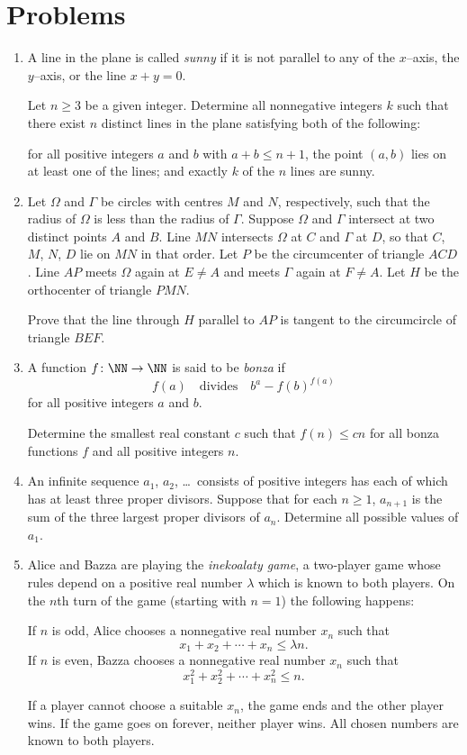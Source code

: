 \documentclass[11pt]{scrartcl}
\begin{document}
\section{Problems}
\begin{enumerate}[\bfseries 1.]
\item %
A line in the plane is called \emph{sunny}
if it is not parallel to any of the $x$–axis, the $y$–axis, or the line $x+y=0$.

Let $n \ge 3$ be a given integer.
Determine all nonnegative integers $k$ such that there exist $n$ distinct lines
in the plane satisfying both of the following:
\begin{itemize}
\ii for all positive integers $a$ and $b$ with $a+b\le n+1$,
  the point $(a,b)$ lies on at least one of the lines; and
\ii exactly $k$ of the $n$ lines are sunny.
\end{itemize}

\item %
Let $\Omega$ and $\Gamma$ be circles with centres $M$ and $N$, respectively,
such that the radius of $\Omega$ is less than the radius of $\Gamma$.
Suppose $\Omega$ and $\Gamma$ intersect at two distinct points $A$ and $B$.
Line $MN$ intersects $\Omega$ at $C$ and $\Gamma$ at $D$,
so that $C$, $M$, $N$, $D$ lie on $MN$ in that order.
Let $P$ be the circumcenter of triangle $ACD$.
Line $AP$ meets $\Omega$ again at $E \neq A$ and meets $\Gamma$ again at $F \neq A$.
Let $H$ be the orthocenter of triangle $PMN$.

Prove that the line through $H$ parallel to $AP$ is tangent
to the circumcircle of triangle $BEF$.

\item %
A function $f \colon \NN \to \NN$ is said to be \emph{bonza} if
\[ f(a)\quad\text{divides}\quad b^a-f(b)^{f(a)} \]
for all positive integers $a$ and $b$.

Determine the smallest real constant $c$ such that $f(n) \leq cn$
for all bonza functions $f$ and all positive integers $n$.

\item %
An infinite sequence $a_1$, $a_2$, \dots\ consists of positive integers
has each of which has at least three proper divisors.
Suppose that for each $n\geq 1$,
$a_{n+1}$ is the sum of the three largest proper divisors of $a_n$.
Determine all possible values of $a_1$.

\item %
Alice and Bazza are playing the \emph{inekoalaty game},
a two‑player game whose rules depend on a positive real number $\lambda$ which is known to both players.
On the $n$th turn of the game (starting with $n=1$) the following happens:
\begin{itemize}
  \ii If $n$ is odd, Alice chooses a nonnegative real number $x_n$ such that
  \[ x_1 + x_2 + \cdots + x_n \le \lambda n.  \]
  \ii If $n$ is even, Bazza chooses a nonnegative real number $x_n$ such that
  \[ x_1^2 + x_2^2 + \cdots + x_n^2 \le n.  \]
\end{itemize}
If a player cannot choose a suitable $x_n$, the game ends and the other player wins.
If the game goes on forever, neither player wins.
All chosen numbers are known to both players.


\end{enumerate}
\end{document}

